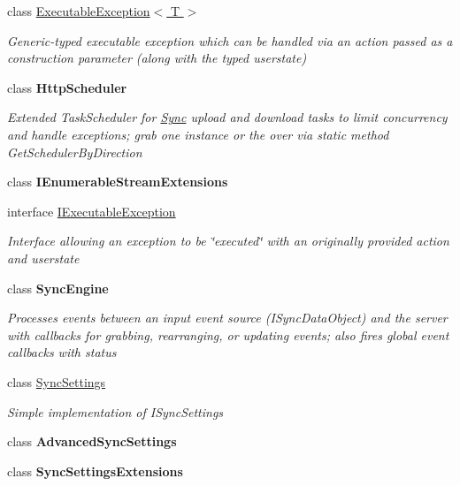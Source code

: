 \begin{DoxyCompactItemize}
\item 
class \hyperlink{class_cloud_api_public_1_1_sync_1_1_executable_exception_3_01_t_01_4}{Executable\-Exception$<$ T $>$}
\begin{DoxyCompactList}\small\item\em Generic-\/typed executable exception which can be handled via an action passed as a construction parameter (along with the typed userstate) \end{DoxyCompactList}\item 
class {\bfseries Http\-Scheduler}
\begin{DoxyCompactList}\small\item\em Extended Task\-Scheduler for \hyperlink{namespace_cloud_api_public_1_1_sync}{Sync} upload and download tasks to limit concurrency and handle exceptions; grab one instance or the over via static method Get\-Scheduler\-By\-Direction \end{DoxyCompactList}\item 
class {\bfseries I\-Enumerable\-Stream\-Extensions}
\item 
interface \hyperlink{interface_cloud_api_public_1_1_sync_1_1_i_executable_exception}{I\-Executable\-Exception}
\begin{DoxyCompactList}\small\item\em Interface allowing an exception to be \char`\"{}executed\char`\"{} with an originally provided action and userstate \end{DoxyCompactList}\item 
class {\bfseries Sync\-Engine}
\begin{DoxyCompactList}\small\item\em Processes events between an input event source (I\-Sync\-Data\-Object) and the server with callbacks for grabbing, rearranging, or updating events; also fires global event callbacks with status \end{DoxyCompactList}\item 
class \hyperlink{class_cloud_api_public_1_1_sync_1_1_sync_settings}{Sync\-Settings}
\begin{DoxyCompactList}\small\item\em Simple implementation of I\-Sync\-Settings \end{DoxyCompactList}\item 
class {\bfseries Advanced\-Sync\-Settings}
\item 
class {\bfseries Sync\-Settings\-Extensions}
\end{DoxyCompactItemize}
